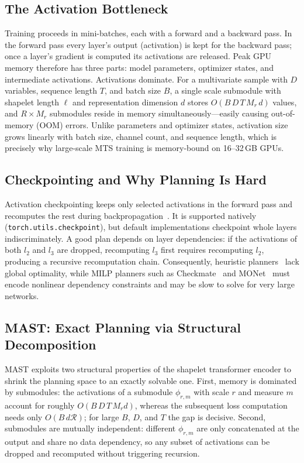 \documentclass[sigconf]{acmart}
\begin{document}
\subsection{The Activation Bottleneck}

Training proceeds in mini-batches, each with a forward and a backward pass. In
the forward pass every layer's output (activation) is kept for the backward
pass; once a layer's gradient is computed its activations are released. Peak GPU
memory therefore has three parts: model parameters, optimizer states, and
intermediate activations. Activations dominate. For a multivariate sample with
$D$ variables, sequence length $T$, and batch size $B$, a single scale submodule
with shapelet length $\ell$ and representation dimension $d$ stores
$O(B\,D\,T\,M_r\,d)$ values, and $R\times M_r$ submodules reside in memory
simultaneously---easily causing out-of-memory (OOM) errors. Unlike parameters and
optimizer states, activation size grows linearly with batch size, channel count,
and sequence length, which is precisely why large-scale MTS training is
memory-bound on 16--32\,GB GPUs.

\subsection{Checkpointing and Why Planning Is Hard}

Activation checkpointing keeps only selected activations in the forward pass and
recomputes the rest during backpropagation~\cite{chen2016checkpoint}. It is
supported natively (\texttt{torch.utils.checkpoint}), but default
implementations checkpoint whole layers indiscriminately. A good plan depends on
layer dependencies: if the activations of both $l_2$ and $l_3$ are dropped,
recomputing $l_3$ first requires recomputing $l_2$, producing a recursive
recomputation chain. Consequently, heuristic planners~\cite{mimose} lack global
optimality, while MILP planners such as
Checkmate~\cite{checkmate} and MONet~\cite{monet} must encode nonlinear
dependency constraints and may be slow to solve for very large networks.

\subsection{MAST: Exact Planning via Structural Decomposition}

MAST exploits two structural properties of the shapelet transformer encoder to
shrink the planning space to an exactly solvable one. First, memory is dominated
by submodules: the activations of a submodule $\phi_{r,m}$ with scale $r$ and
measure $m$ account for roughly $O(B\,D\,T\,M_r d)$, whereas the subsequent loss
computation needs only $O(B\,d\mathcal{R})$; for large $B$, $D$, and $T$ the gap
is decisive. Second, submodules are mutually independent: different
$\phi_{r,m}$ are only concatenated at the output and share no data dependency, so
any subset of activations can be dropped and recomputed without triggering
recursion.
\end{document}
